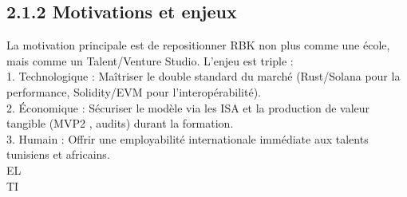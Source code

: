 \subsection{2.1.2 Motivations et enjeux}
La motivation principale est de repositionner RBK non plus comme une école, mais comme un Talent/Venture Studio. L’enjeu est triple :\\
\vspace{0.5em}
1. Technologique : Maîtriser le double standard du marché (Rust/Solana pour la performance, Solidity/EVM pour l’interopérabilité).\\
\vspace{0.5em}
2. Économique : Sécuriser le modèle via les ISA et la production de valeur tangible (MVP2 , audits) durant la formation.\\
\vspace{0.5em}
3. Humain : Offrir une employabilité internationale immédiate aux talents tunisiens et africains.\\
\vspace{0.5em}
\vspace{0.5em}
\vspace{0.5em}
\vspace{0.5em}
EL\\
TI\\
